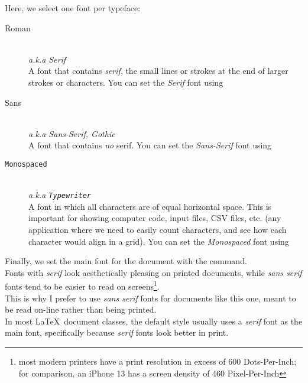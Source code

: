 Here, we select one font per typeface:
\begin{description}
	\item[\textrm{Roman}]  \mbox{}\\ 
		\emph{a.k.a \textrm{Serif}}  \\
		A font that contains \emph{serif}, the small lines or strokes at the end of larger strokes or characters.
		You can set the \emph{Serif} font using \\ 
		
	\item[\textsf{Sans}] \mbox{}\\ 
		\emph{a.k.a \textsf{Sans-Serif, Gothic}}  \\
		A font that contains \emph{no} serif.
		You can set the \emph{Sans-Serif} font using \\ 
	
	\item[\texttt{Monospaced}]  \mbox{}\\ 
		\emph{a.k.a \texttt{Typewriter}} \\
		A font in which all characters are of equal horizontal space. 
		This is important for showing computer code, input files, CSV files, etc. (any application where we need to easily count characters, and see how each character would align in a grid). 
		You can set the \emph{Monospaced} font using \\ 
		
\end{description}

Finally, we set the main font for the document with the   command. \\

Fonts with \emph{serif} look aesthetically pleasing on printed documents, while \emph{sans serif} fonts tend to be easier to read on screens\footnote{most modern printers have a print resolution in excess of 600 Dots-Per-Inch; for comparison, an iPhone 13 has a screen density of 460 Pixel-Per-Inch}.
\\


This is why I prefer to use \emph{sans serif} fonts for documents like this one, meant to be read on-line rather than being printed. \\


In most \LaTeX\ document classes, the default style usually uses a \emph{serif} font as the main font, specifically because \emph{serif} fonts look better in print. \\

